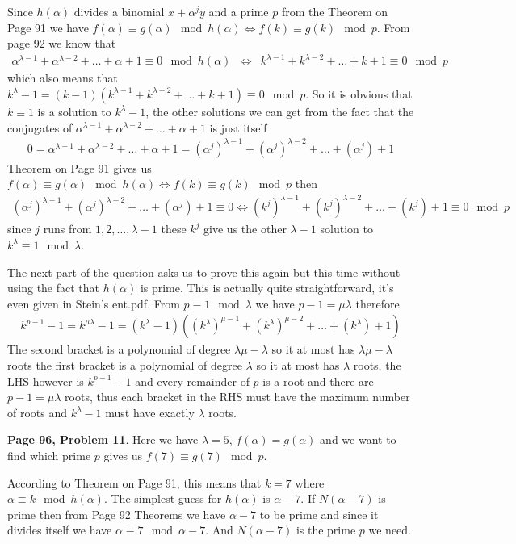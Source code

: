\documentclass[aps,preprint,preprintnumbers,nofootinbib,showpacs,prd]{revtex4-1}
\newcommand{\nbea}{\begin{eqnarray*}}
\newcommand{\neea}{\end{eqnarray*}}
\begin{document}
Since $h(\alpha)$ divides a binomial $x + \alpha^j y$ and a prime $p$ from the Theorem on Page 91 we have $f(\alpha) \equiv g(\alpha) \mod{h(\alpha)} \Longleftrightarrow f(k) \equiv g(k) \mod{p}$. From page 92 we know that
%
\nbea
\alpha^{\lambda - 1} + \alpha^{\lambda - 2} + \dots + \alpha + 1 \equiv 0 \mod{h(\alpha)} & \Longleftrightarrow & k^{\lambda - 1} + k^{\lambda - 2} + \dots + k + 1 \equiv 0 \mod{p}
\neea
%
which also means that $k^\lambda - 1 = (k-1)(k^{\lambda - 1} + k^{\lambda - 2} + \dots + k + 1) \equiv 0 \mod{p}$. So it is obvious that $k \equiv 1$ is a solution to $k^\lambda - 1$, the other solutions we can get from the fact that the conjugates of $\alpha^{\lambda - 1} + \alpha^{\lambda - 2} + \dots + \alpha + 1$ is just itself
%
\nbea
0 = \alpha^{\lambda - 1} + \alpha^{\lambda - 2} + \dots + \alpha + 1 = (\alpha^j)^{\lambda - 1} + (\alpha^j)^{\lambda - 2} + \dots + (\alpha^j) + 1
\neea
%
Theorem on Page 91 gives us $f(\alpha) \equiv g(\alpha) \mod{h(\alpha)} \Longleftrightarrow f(k) \equiv g(k) \mod{p}$ then 
%
\nbea
(\alpha^j)^{\lambda - 1} + (\alpha^j)^{\lambda - 2} + \dots + (\alpha^j) + 1 \equiv 0 \Longleftrightarrow (k^j)^{\lambda - 1} + (k^j)^{\lambda - 2} + \dots + (k^j) + 1 \equiv 0 \mod{p}
\neea
%
since $j$ runs from $1,2,\dots, \lambda-1$ these $k^j$ give us the other $\lambda - 1$ solution to $k^\lambda \equiv 1 \mod{\lambda}$.

The next part of the question asks us to prove this again but this time without using the fact that $h(\alpha)$ is prime. This is actually quite straightforward, it's even given in Stein's ent.pdf. From $p \equiv 1 \mod{\lambda}$ we have $p - 1 = \mu\lambda$ therefore
%
\nbea
k^{p-1} - 1 = k^{\mu\lambda} - 1 = (k^\lambda - 1)((k^\lambda)^{\mu-1} + (k^\lambda)^{\mu - 2} + \dots + (k^\lambda) + 1)
\neea
%
The second bracket is a polynomial of degree $\lambda\mu - \lambda$ so it at most has $\lambda\mu - \lambda$ roots the first bracket is a polynomial of degree $\lambda$ so it at most has $\lambda$ roots, the LHS however is $k^{p-1} - 1$ and every remainder of $p$ is a root and there are $p - 1 = \mu\lambda$ roots, thus each bracket in the RHS must have the maximum number of roots and $k^\lambda - 1$ must have exactly $\lambda$ roots.

{\bf Page 96, Problem 11}. Here we have $\lambda = 5$, $f(\alpha) = g(\alpha)$ and we want to find which prime $p$ gives us $f(7) \equiv g(7) \mod{p}$.

According to Theorem on Page 91, this means that $k = 7$ where $\alpha \equiv k \mod{h(\alpha)}$. The simplest guess for $h(\alpha)$ is $\alpha - 7$. If $N(\alpha - 7)$ is prime then from Page 92 Theorems we have $\alpha - 7$ to be prime and since it divides itself we have $\alpha \equiv 7 \mod{\alpha - 7}$. And $N(\alpha - 7)$ is the prime $p$ we need.
\end{document}
